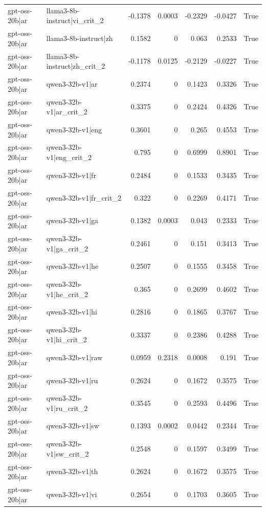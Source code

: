 \begin{table}
\begin{tabular}{l l r r r r l}
gpt-oss-20b|ar & llama3-8b-instruct|vi_crit_2 & -0.1378 & 0.0003 & -0.2329 & -0.0427 & True \\
gpt-oss-20b|ar & llama3-8b-instruct|zh & 0.1582 & 0 & 0.063 & 0.2533 & True \\
gpt-oss-20b|ar & llama3-8b-instruct|zh_crit_2 & -0.1178 & 0.0125 & -0.2129 & -0.0227 & True \\
gpt-oss-20b|ar & qwen3-32b-v1|ar & 0.2374 & 0 & 0.1423 & 0.3326 & True \\
gpt-oss-20b|ar & qwen3-32b-v1|ar_crit_2 & 0.3375 & 0 & 0.2424 & 0.4326 & True \\
gpt-oss-20b|ar & qwen3-32b-v1|eng & 0.3601 & 0 & 0.265 & 0.4553 & True \\
gpt-oss-20b|ar & qwen3-32b-v1|eng_crit_2 & 0.795 & 0 & 0.6999 & 0.8901 & True \\
gpt-oss-20b|ar & qwen3-32b-v1|fr & 0.2484 & 0 & 0.1533 & 0.3435 & True \\
gpt-oss-20b|ar & qwen3-32b-v1|fr_crit_2 & 0.322 & 0 & 0.2269 & 0.4171 & True \\
gpt-oss-20b|ar & qwen3-32b-v1|ga & 0.1382 & 0.0003 & 0.043 & 0.2333 & True \\
gpt-oss-20b|ar & qwen3-32b-v1|ga_crit_2 & 0.2461 & 0 & 0.151 & 0.3413 & True \\
gpt-oss-20b|ar & qwen3-32b-v1|he & 0.2507 & 0 & 0.1555 & 0.3458 & True \\
gpt-oss-20b|ar & qwen3-32b-v1|he_crit_2 & 0.365 & 0 & 0.2699 & 0.4602 & True \\
gpt-oss-20b|ar & qwen3-32b-v1|hi & 0.2816 & 0 & 0.1865 & 0.3767 & True \\
gpt-oss-20b|ar & qwen3-32b-v1|hi_crit_2 & 0.3337 & 0 & 0.2386 & 0.4288 & True \\
gpt-oss-20b|ar & qwen3-32b-v1|raw & 0.0959 & 0.2318 & 0.0008 & 0.191 & True \\
gpt-oss-20b|ar & qwen3-32b-v1|ru & 0.2624 & 0 & 0.1672 & 0.3575 & True \\
gpt-oss-20b|ar & qwen3-32b-v1|ru_crit_2 & 0.3545 & 0 & 0.2593 & 0.4496 & True \\
gpt-oss-20b|ar & qwen3-32b-v1|sw & 0.1393 & 0.0002 & 0.0442 & 0.2344 & True \\
gpt-oss-20b|ar & qwen3-32b-v1|sw_crit_2 & 0.2548 & 0 & 0.1597 & 0.3499 & True \\
gpt-oss-20b|ar & qwen3-32b-v1|th & 0.2624 & 0 & 0.1672 & 0.3575 & True \\
gpt-oss-20b|ar & qwen3-32b-v1|vi & 0.2654 & 0 & 0.1703 & 0.3605 & True \\

\end{tabular}
\end{table}
